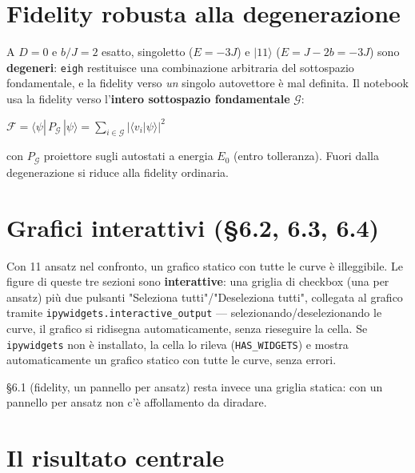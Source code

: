 \documentclass[11pt,a4paper]{article}
\begin{document}
\section{Fidelity robusta alla degenerazione}

A $D=0$ e $b/J=2$ esatto, singoletto ($E=-3J$) e $|11\rangle$
($E=J-2b=-3J$) sono \textbf{degeneri}: \texttt{eigh} restituisce una
combinazione arbitraria del sottospazio fondamentale, e la fidelity
verso \emph{un} singolo autovettore è mal definita. Il notebook usa la
fidelity verso l'\textbf{intero sottospazio fondamentale} $\mathcal G$:
\begin{keyeq}
\centering
$\mathcal F = \langle\psi|\,P_{\mathcal G}\,|\psi\rangle = \displaystyle\sum_{i\in\mathcal G}|\langle v_i|\psi\rangle|^2$
\end{keyeq}
con $P_{\mathcal G}$ proiettore sugli autostati a energia $E_0$ (entro
tolleranza). Fuori dalla degenerazione si riduce alla fidelity
ordinaria.

\section{Grafici interattivi (\S 6.2, 6.3, 6.4)}

Con 11 ansatz nel confronto, un grafico statico con tutte le curve è
illeggibile. Le figure di queste tre sezioni sono \textbf{interattive}:
una griglia di checkbox (una per ansatz) più due pulsanti "Seleziona
tutti"/"Deseleziona tutti", collegata al grafico tramite
\texttt{ipywidgets.interactive\_output} --- selezionando/deselezionando
le curve, il grafico si ridisegna automaticamente, senza rieseguire la
cella. Se \texttt{ipywidgets} non è installato, la cella lo rileva
(\texttt{HAS\_WIDGETS}) e mostra automaticamente un grafico statico con
tutte le curve, senza errori.

\S 6.1 (fidelity, un pannello per ansatz) resta invece una griglia
statica: con un pannello per ansatz non c'è affollamento da diradare.

\section{Il risultato centrale}
\end{document}
